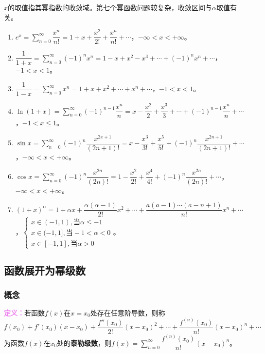 \documentclass[UTF8, 12pt]{ctexart}
\begin{document}
$x$的取值指其幂指数的收敛域。第七个幂函数问题较复杂，收敛区间与$\alpha$取值有关。

\begin{enumerate}
    \item $e^x=\sum\limits_{n=0}^\infty\dfrac{x^n}{n!}=1+x+\dfrac{x^2}{2!}+\dfrac{x^n}{n!}+\cdots$，$-\infty<x<+\infty$。
    \item $\dfrac{1}{1+x}=\sum\limits_{n=0}^\infty(-1)^nx^n=1-x+x^2-x^3+\cdots+(-1)^nx^n+\cdots$，$-1<x<1$。
    \item $\dfrac{1}{1-x}=\sum\limits_{n=0}^\infty x^n=1+x+x^2+\cdots+x^n+\cdots$，$-1<x<1$。
    \item $\ln(1+x)=\sum\limits_{n=0}^\infty(-1)^{n-1}\dfrac{x^n}{n}=x-\dfrac{x^2}{2}+\dfrac{x^3}{3}+\cdots+(-1)^{n-1}\dfrac{x^n}{n}+\cdots$，$-1<x\leqslant1$。
    \item $\sin x=\sum\limits_{n=0}^\infty(-1)^n\dfrac{x^{2x+1}}{(2n+1)!}=x-\dfrac{x^3}{3!}+\dfrac{x^5}{5!}+(-1)^n\dfrac{x^{2n+1}}{(2n+1)!}+\cdots$，$-\infty<x<+\infty$。
    \item $\cos x=\sum\limits_{n=0}^\infty(-1)^n\dfrac{x^{2n}}{(2n)!}=1-\dfrac{x^2}{2!}+\dfrac{x^4}{4!}+(-1)^n\dfrac{x^{2n}}{(2n)!}+\cdots$，$-\infty<x<+\infty$。
    \item $(1+x)^\alpha=1+\alpha x+\dfrac{\alpha(\alpha-1)}{2!}x^2+\cdots+\dfrac{a(a-1)\cdots(a-n+1)}{n!}x^n+\cdots$，$\left\{\begin{array}{l}
        x\in(-1,1),\text{当}\alpha\leqslant-1 \\
        x\in(-1,1],\text{当}-1<\alpha<0 \\
        x\in[-1,1],\text{当}\alpha>0
    \end{array}\right.$。
\end{enumerate}

\subsection{函数展开为幂级数}

\subsubsection{概念}

\textcolor{violet}{\textbf{定义：}}若函数$f(x)$在$x=x_0$处存在任意阶导数，则称$f(x_0)+f'(x_0)(x-x_0)+\dfrac{f''(x_0)}{2!}(x-x_0)^2+\cdots+\dfrac{f^{(n)}(x_0)}{n!}(x-x_0)^n+\cdots$为函数$f(x)$在$x_0$处的\textbf{泰勒级数}，则$f(x)=\sum\limits_{n=0}^\infty\dfrac{f^{(n)}(x_0)}{n!}(x-x_0)^n$。
\end{document}
